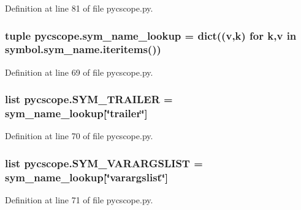 Definition at line 81 of file pycscope.\-py.

\hypertarget{namespacepycscope_a178c83c89678929965e9d8dd5f38b22a}{
\subsubsection[{sym\-\_\-name\-\_\-lookup}]{\setlength{\rightskip}{0pt plus 5cm}tuple pycscope.\-sym\-\_\-name\-\_\-lookup = dict(({\bf v},k) {\bf for} k,{\bf v} in symbol.\-sym\-\_\-name.\-iteritems())}}\label{namespacepycscope_a178c83c89678929965e9d8dd5f38b22a}


Definition at line 69 of file pycscope.\-py.

\hypertarget{namespacepycscope_ab4c97a063679d55deb7f785cc59c064f}{
\subsubsection[{S\-Y\-M\-\_\-\-T\-R\-A\-I\-L\-E\-R}]{\setlength{\rightskip}{0pt plus 5cm}list pycscope.\-S\-Y\-M\-\_\-\-T\-R\-A\-I\-L\-E\-R = {\bf sym\-\_\-name\-\_\-lookup}\mbox{[}\char`\"{}trailer\char`\"{}\mbox{]}}}\label{namespacepycscope_ab4c97a063679d55deb7f785cc59c064f}


Definition at line 70 of file pycscope.\-py.

\hypertarget{namespacepycscope_ae73b4bb791682cb31b75b1b7c2cece1b}{
\subsubsection[{S\-Y\-M\-\_\-\-V\-A\-R\-A\-R\-G\-S\-L\-I\-S\-T}]{\setlength{\rightskip}{0pt plus 5cm}list pycscope.\-S\-Y\-M\-\_\-\-V\-A\-R\-A\-R\-G\-S\-L\-I\-S\-T = {\bf sym\-\_\-name\-\_\-lookup}\mbox{[}\char`\"{}varargslist\char`\"{}\mbox{]}}}\label{namespacepycscope_ae73b4bb791682cb31b75b1b7c2cece1b}


Definition at line 71 of file pycscope.\-py.

